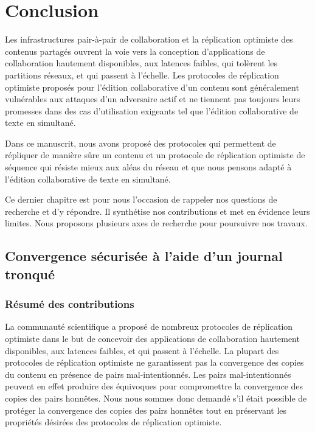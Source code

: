 
\chapter{Conclusion}\label{ch:conclusion}

\minitoc{}
\bigskip


Les infrastructures pair-à-pair de collaboration et la réplication optimiste des contenus partagés ouvrent la voie vers la conception d'applications de collaboration hautement disponibles, aux latences faibles, qui tolèrent les partitions réseaux, et qui passent à l'échelle.
Les protocoles de réplication optimiste proposés pour l'édition collaborative d'un contenu sont généralement vulnérables aux attaques d'un adversaire actif et ne tiennent pas toujours leurs promesses dans des cas d'utilisation exigeants tel que l'édition collaborative de texte en simultané.

Dans ce manuscrit, nous avons proposé des protocoles qui permettent de répliquer de manière sûre un contenu et un protocole de réplication optimiste de séquence qui résiste mieux aux aléas du réseau et que nous pensons adapté à l'édition collaborative de texte en simultané.

Ce dernier chapitre est pour nous l'occasion de rappeler nos questions de recherche et d'y répondre.
Il synthétise nos contributions et met en évidence leurs limites.
Nous proposons plusieurs axes de recherche pour poursuivre nos travaux.


\clearpage


\section{Convergence sécurisée à l'aide d'un journal tronqué}

\subsection{Résumé des contributions}

La communauté scientifique a proposé de nombreux protocoles de réplication optimiste dans le but de concevoir des applications de collaboration hautement disponibles, aux latences faibles, et qui passent à l'échelle.
La plupart des protocoles de réplication optimiste ne garantissent pas la convergence des copies du contenu en présence de pairs mal-intentionnés.
Les pairs mal-intentionnés peuvent en effet produire des équivoques pour compromettre la convergence des copies des pairs honnêtes.
Nous nous sommes donc demandé s'il était possible de protéger la convergence des copies des pairs honnêtes tout en préservant les propriétés désirées des protocoles de réplication optimiste.

